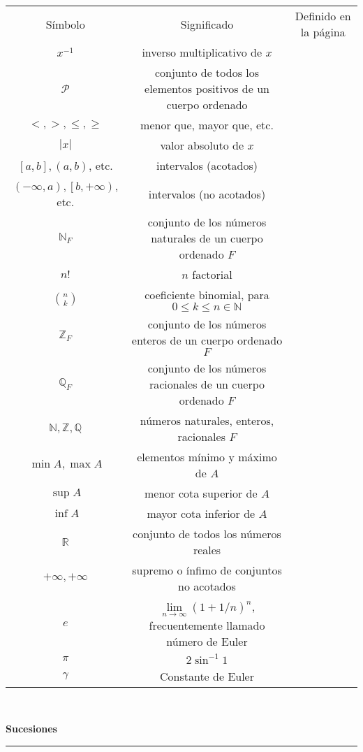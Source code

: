 \documentclass[a4,paper]{article}
\newcommand{\centrado}[1]{
	\ \\[.1\baselineskip]
	{\Large\bfseries\centering #1\par}
	\hrule
	\ \\[.1\baselineskip]
}
\begin{document}
\begin{tabular}{ccc}
	Símbolo & Significado & Definido en la página \\
	$x^{-1}$ & inverso multiplicativo de $x$ & \\
	$\mathcal{P}$ & conjunto de todos los elementos positivos de un cuerpo ordenado & \\
	$<,>,\leq,\geq$ & menor que, mayor que, etc. & \\
	$|x|$ & valor absoluto de $x$ & \\
	$\left[a,b\right],\left(a,b\right)$, etc. & intervalos (acotados) & \\
	$\left(-\infty,a\right),\left[b,+\infty\right)$, etc. & intervalos (no acotados) & \\
	$\mathbb{N}_{F}$ & conjunto de los números naturales de un cuerpo ordenado  $F$ & \\
	$n!$ & $n$ factorial & \\
	$\binom{n}{k}$ & coeficiente binomial, para $0\leq k\leq n\in\mathbb{N}$ & \\
	$\mathbb{Z}_{F}$ & conjunto de los números enteros de un cuerpo ordenado  $F$ & \\
	$\mathbb{Q}_{F}$ & conjunto de los números racionales de un cuerpo ordenado  $F$ & \\
	$\mathbb{N},\mathbb{Z},\mathbb{Q}$ & números naturales, enteros, racionales  $F$ & \\
	$\min A, \max A$ & elementos mínimo y máximo de $A$ & \\
	$\sup A$ & menor cota superior de $A$ &\\
	$\inf A$ & mayor cota inferior de $A$ &\\
	$\mathbb{R}$ & conjunto de todos los números reales & \\
	$+\infty,+\infty$ & supremo o ínfimo de conjuntos no acotados \\
	$e$ & $\lim\limits_{n\to\infty}{\left(1+1/n\right)}^{n}$, frecuentemente llamado número de Euler & \\
	$\pi$ & $2\sin^{-1}1$ & \\
	$\gamma$ & Constante de Euler & \\
\end{tabular}
\centrado{Sucesiones}
\end{document}
